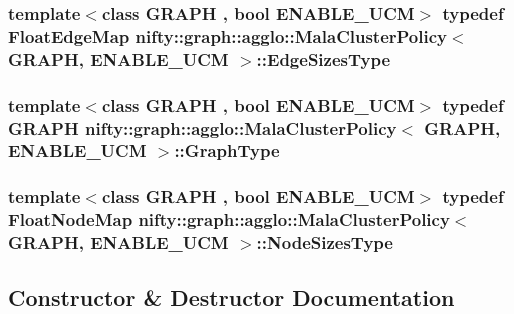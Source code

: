 \subsubsection[{Edge\+Sizes\+Type}]{\setlength{\rightskip}{0pt plus 5cm}template$<$class G\+R\+A\+P\+H , bool E\+N\+A\+B\+L\+E\+\_\+\+U\+C\+M$>$ typedef Float\+Edge\+Map {\bf nifty\+::graph\+::agglo\+::\+Mala\+Cluster\+Policy}$<$ G\+R\+A\+P\+H, E\+N\+A\+B\+L\+E\+\_\+\+U\+C\+M $>$\+::{\bf Edge\+Sizes\+Type}}\label{classnifty_1_1graph_1_1agglo_1_1MalaClusterPolicy_a33924545e782bd520270341b21599e7e}
\hypertarget{classnifty_1_1graph_1_1agglo_1_1MalaClusterPolicy_ae2696b85f3f04787282e003bead20a5d}{}
\subsubsection[{Graph\+Type}]{\setlength{\rightskip}{0pt plus 5cm}template$<$class G\+R\+A\+P\+H , bool E\+N\+A\+B\+L\+E\+\_\+\+U\+C\+M$>$ typedef G\+R\+A\+P\+H {\bf nifty\+::graph\+::agglo\+::\+Mala\+Cluster\+Policy}$<$ G\+R\+A\+P\+H, E\+N\+A\+B\+L\+E\+\_\+\+U\+C\+M $>$\+::{\bf Graph\+Type}}\label{classnifty_1_1graph_1_1agglo_1_1MalaClusterPolicy_ae2696b85f3f04787282e003bead20a5d}
\hypertarget{classnifty_1_1graph_1_1agglo_1_1MalaClusterPolicy_a559774b548ec31fb481a848a12a45abe}{}
\subsubsection[{Node\+Sizes\+Type}]{\setlength{\rightskip}{0pt plus 5cm}template$<$class G\+R\+A\+P\+H , bool E\+N\+A\+B\+L\+E\+\_\+\+U\+C\+M$>$ typedef Float\+Node\+Map {\bf nifty\+::graph\+::agglo\+::\+Mala\+Cluster\+Policy}$<$ G\+R\+A\+P\+H, E\+N\+A\+B\+L\+E\+\_\+\+U\+C\+M $>$\+::{\bf Node\+Sizes\+Type}}\label{classnifty_1_1graph_1_1agglo_1_1MalaClusterPolicy_a559774b548ec31fb481a848a12a45abe}


\subsection{Constructor \& Destructor Documentation}
\hypertarget{classnifty_1_1graph_1_1agglo_1_1MalaClusterPolicy_a764281b5b0b47bdec55ec8ab031100aa}{}
